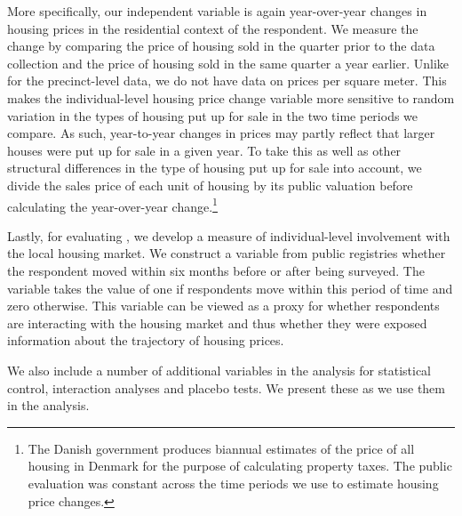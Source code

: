 \documentclass[12pt,a4paper]{article}
\begin{document}
	More specifically, our independent variable is again year-over-year changes in housing prices in the residential context of the respondent. We measure the change by comparing the price of housing sold in the quarter prior to the data collection and the price of housing sold in the same quarter a year earlier. Unlike for the precinct-level data, we do not have data on prices per square meter. This makes the individual-level housing price change variable more sensitive to random variation in the types of housing put up for sale in the two time periods we compare. As such, year-to-year changes in prices may partly reflect that larger houses were put up for sale in a given year. To take this as well as other structural differences in the type of housing put up for sale into account, we divide the sales price of each unit of housing by its public valuation before calculating the year-over-year change.\footnote{The Danish government produces biannual estimates of the price of all housing in Denmark for the purpose of calculating property taxes. The public evaluation was constant across the time periods we use to estimate housing price changes.}
	
	Lastly, for evaluating \htwo, we develop a measure of individual-level involvement with the local housing market. We construct a variable from public registries whether the respondent moved within six months before or after being surveyed. The variable takes the value of one if respondents move within this period of time and zero otherwise. This variable can be viewed as a proxy for whether respondents are interacting with the housing market and thus whether they were exposed information about the trajectory of housing prices.
	
	We also include a number of additional variables in the analysis for statistical control, interaction analyses and placebo tests. We present these as we use them in the analysis. 
	
\end{document}
